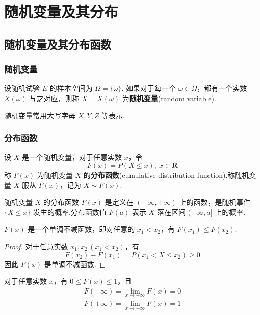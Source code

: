 
\chapter{随机变量及其分布}
\thispagestyle{plain}

\section{随机变量及其分布函数}

\subsection{随机变量}

\begin{definition}
    \indent 设随机试验 $E$ 的样本空间为 $\varOmega=\{\omega\}$. 如果对于每一个 $\omega\in\varOmega$，都有一个实数 $X(\omega)$ 与之对应，则称 $X=X(\omega)$ 为\textbf{随机变量}(random variable).
\end{definition}

随机变量常用大写字母 $X,Y,Z$ 等表示.

\subsection{分布函数}

\begin{definition}
    \indent 设 $X$ 是一个随机变量，对于任意实数 $x$，令
    $$
    F(x)=P(X \leqslant x), \ x \in \mathbf{R}
    $$
    称 $F(x)$ 为随机变量 $X$ 的\textbf{分布函数}(cumulative distribution function).称随机变量 $X$ 服从 $F(x)$，记为 $X \sim F(x)$.
\end{definition}

随机变量 $X$ 的分布函数 $F(x)$ 是定义在 $(-\infty, +\infty)$ 上的函数，是随机事件 $\{X \leqslant x\}$ 发生的概率.分布函数值 $F(a)$ 表示 $X$ 落在区间 $(-\infty,a]$ 上的概率.

\begin{property}[][单调性]
    \indent $F(x)$ 是一个单调不减函数，即对任意的 $x_1 < x_2$，有 $F(x_1) \leqslant F(x_2)$.
\end{property}

\begin{proof}
    对于任意实数 $x_1, x_2\, (x_1 < x_2)$，有
    $$
    F(x_2) - F(x_1) = P(x_1 < X \leqslant x_2) \geqslant 0
    $$
    因此 $F(x)$ 是单调不减函数.
\end{proof}

\begin{property}[][有界性]
    \indent 对于任意实数 $x$，有 $0 \leqslant F(x) \leqslant 1$，且
    \begin{gather*}
        F(-\infty)= \lim_{x \to -\infty} F(x) = 0 \\
        F(+\infty)= \lim_{x \to +\infty} F(x) = 1
    \end{gather*}
\end{property}

